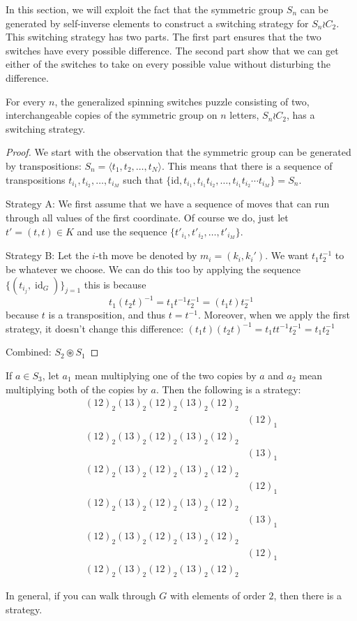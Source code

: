 In this section, we will exploit the fact that the symmetric group $S_n$ can
be generated by self-inverse elements to construct a switching strategy for
$S_n \wr C_2$.
This switching strategy has two parts.
The first part ensures that the two switches have every possible difference.
The second part show that we can get either of the switches to take on every
possible value without disturbing the difference.
\begin{theorem}
  For every $n$, the generalized spinning switches puzzle consisting of two,
  interchangeable copies of the symmetric group on $n$ letters, $S_n \wr C_2$,
  has a switching strategy.
\end{theorem}
\begin{proof}
  We start with the observation that the symmetric group can be generated by
  transpositions: $S_n = \langle t_1, t_2, \dots, t_N\rangle$.
  This means that there is a sequence of transpositions $t_{i_1}, t_{i_2}, \dots, t_{i_M}$
  such that $\{\mathrm{id}, t_{i_1}, t_{i_1}t_{i_2}, \dots, t_{i_1}t_{i_2}\cdots t_{i_M}\} = S_n$.

  Strategy A: We first assume that we have a sequence of moves that can run
  through all values of the first coordinate.
  Of course we do, just let $t' = (t, t) \in K$ and use the sequence
  $\{t'_{i_1}, t'_{i_2}, \dots , t'_{i_M}\}$.

  Strategy B: Let the $i$-th move be denoted by $m_i = (k_i, k_i')$.
  We want $t_1t_2^{-1}$ to be whatever we choose. We can do this too by
  applying the sequence $\{(t_{i_j}, \operatorname{id}_G)\}_{j=1}$ this is because
  \[
    t_1(t_2t)^{-1} = t_1t^{-1}t_2^{-1} = (t_1t)t_2^{-1}
  \] because $t$ is a transposition, and thus $t = t^{-1}$.
  Moreover, when we apply the first strategy, it doesn't change this difference:
  $(t_1t)(t_2t)^{-1} = t_1tt^{-1}t_2^{-1} = t_1t_2^{-1}$

  Combined: $S_2 \circledast S_1$
\end{proof}
\begin{example}
  If $a \in S_3$, let $a_1$ mean multiplying one of the two copies by $a$ and
  $a_2$ mean multiplying both of the copies by $a$. Then the following is
  a strategy:
  \begin{align*}
    (12)_2(13)_2(12)_2(13)_2(12)_2 \\
    &(12)_1 \\
    (12)_2(13)_2(12)_2(13)_2(12)_2 \\
    &(13)_1 \\
    (12)_2(13)_2(12)_2(13)_2(12)_2 \\
    &(12)_1 \\
    (12)_2(13)_2(12)_2(13)_2(12)_2 \\
    &(13)_1 \\
    (12)_2(13)_2(12)_2(13)_2(12)_2 \\
    &(12)_1 \\
    (12)_2(13)_2(12)_2(13)_2(12)_2
  \end{align*}
  \label{ex:TwoSymmetricGroups}
\end{example}
In general, if you can walk through $G$ with elements of order $2$, then
there is a strategy.

